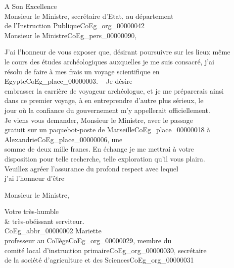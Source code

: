 \documentclass{book}
\begin{document}
\indent A Son Excellence\\
\indent \hspace{0,5cm}Monsieur le Ministre, secrétaire d’Etat, au département\\
\indent \hspace{1cm}de l’Instruction Publique\gls{CoEg_org_00000042}\\

\hspace{1cm} Monsieur le Ministre\gls{CoEg_pers_00000090},\\

\par J’ai l’honneur de vous exposer que, désirant poursuivre sur les lieux même\\
le cours des études archéologiques auxquelles je me suis consacré, j’ai\\
résolu de faire à mes frais un voyage scientifique en Egypte\gls{CoEg_place_00000003}. – Je désire\\
embrasser la carrière de voyageur archéologue, et je me préparerais ainsi\\
dans ce premier voyage, à en entreprendre d’autre plus sérieux, le\\
jour où la confiance du gouvernement m’y appellerait officiellement.\\
\indent Je viens vous demander, Monsieur le Ministre, avec le passage\\
gratuit sur un paquebot-poste de Marseille\gls{CoEg_place_00000018} à Alexandrie\gls{CoEg_place_00000006}, une\\
somme de deux mille francs. En échange je me mettrai à votre\\
disposition pour telle recherche, telle exploration qu’il vous plaira.\\
\indent Veuillez agréer l’assurance du profond respect avec lequel\\
\indent j’ai l’honneur d’être
\begin{center}Monsieur le Ministre,\end{center}
\begin{center}\hspace{5cm}Votre très-humble\\
\hspace{5cm}\& très-obéissant serviteur.\\
\hspace{5cm}\gls{CoEg_abbr_00000002} Mariette\\
\hspace{5cm}professeur au Collège\gls{CoEg_org_00000029}, membre du\\
\hspace{5cm}comité local d’instruction primaire\gls{CoEg_org_00000030}, secrétaire\\
\hspace{5cm}de la société d’agriculture et des Sciences\gls{CoEg_org_00000031}\end{center}
\end{document}
